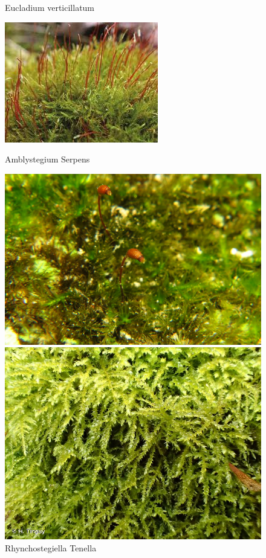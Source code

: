 \documentclass[draft, final]{report}
\begin{document}
\begin{figure}[!ht]
\begin{minipage}[c]{.46\linewidth}
        \caption{Eucladium verticillatum\cite{eucladiumverticillatum}}
    \end{minipage}
    \hfill%
    \begin{minipage}[c]{.46\linewidth}
        \centering
        \includegraphics[scale=0.7]{LateX/Images/amblystegiumserpens.jpg}
        \caption{Amblystegium Serpens\cite{amblystegiumserpens}}
    \end{minipage}
    \hfill%
    \begin{minipage}[c]{.46\linewidth}
        \centering
        \includegraphics[scale=1.2]{LateX/Images/rhynchostegiellatenella.jpg}
        \caption{Rhynchostegiella Tenella\cite{rhynchostegiellatenella}}
    \end{minipage}
    \hfill%
    \begin{minipage}[c]{.46\linewidth}
        \centering
        \includegraphics[scale=0.2]{LateX/Images/oxyrrhynchiumschleicheri.jpg}

\end{minipage}
\end{figure}
\end{document}
